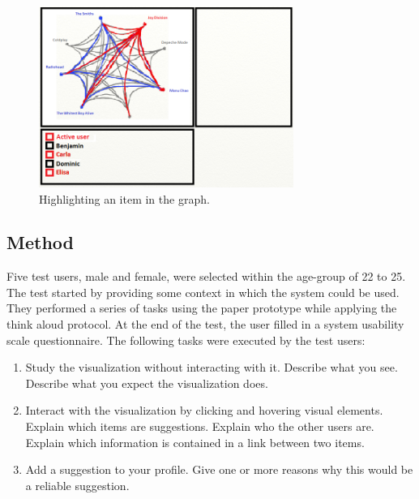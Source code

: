 \documentclass[a4paper,10pt,twocolumn]{article}
\begin{document}
\begin{figure}[!ht]
  \begin{center}
  	
    \includegraphics[width=8.3cm]{data/paperprototype3}
  \end{center}
  \caption{Highlighting an item in the graph.}
  \label{fig:paperprototype3}
\end{figure}


\subsection*{Method}

Five test users, male and female, were selected within the age-group of 22 to 25. The test started by providing some context in which the system could be used. They performed a series of tasks using the paper prototype while applying the think aloud protocol. At the end of the test, the user filled in a system usability scale questionnaire. The following tasks were executed by the test users:

\begin{enumerate}
	\item Study the visualization without interacting with it. Describe what you see. Describe what you expect the visualization does.
	\item Interact with the visualization by clicking and hovering visual elements. Explain which items are suggestions. Explain who the other users are. Explain which information is contained in a link between two items.
	\item Add a suggestion to your profile. Give one or more reasons why this would be a reliable suggestion.
\end{enumerate}
\end{document}
